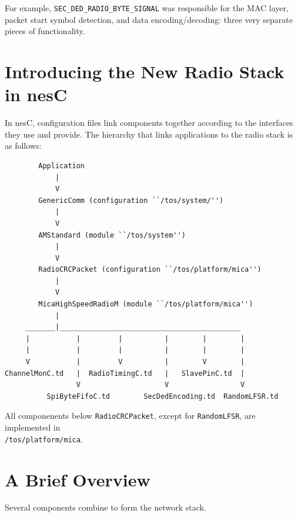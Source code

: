 \documentclass[11pt]{article}
\begin{document}
For example, {\tt SEC\_DED\_RADIO\_BYTE\_SIGNAL} was responsible for the MAC
layer, packet start symbol detection, and data encoding/decoding:
three very separate pieces of functionality.

\section*{Introducing the New Radio Stack in nesC}

In nesC, configuration files link components together according to the
interfaces they use and provide.  The hierarchy that links
applications to the radio stack is as follows:

\small
\begin{verbatim}
        Application
            |
            V
        GenericComm (configuration ``/tos/system/'')
            |
            V
        AMStandard (module ``/tos/system'')
            |
            V
        RadioCRCPacket (configuration ``/tos/platform/mica'')
            |
            V
        MicaHighSpeedRadioM (module ``/tos/platform/mica'')
            |
     _______|___________________________________________
     |           |         |          |        |        |
     |           |         |          |        |        |
     V           |         V          |        V        |  
ChannelMonC.td   |  RadioTimingC.td   |   SlavePinC.td  |
                 V                    V                 V
          SpiByteFifoC.td        SecDedEncoding.td  RandomLFSR.td

\end{verbatim}
\normalsize

All componenents below {\tt RadioCRCPacket}, except for {\tt RandomLFSR}, are  
implemented in \\{\tt /tos/platform/mica}.


\section*{A Brief Overview}

Several components combine to form the network stack.
\end{document}
